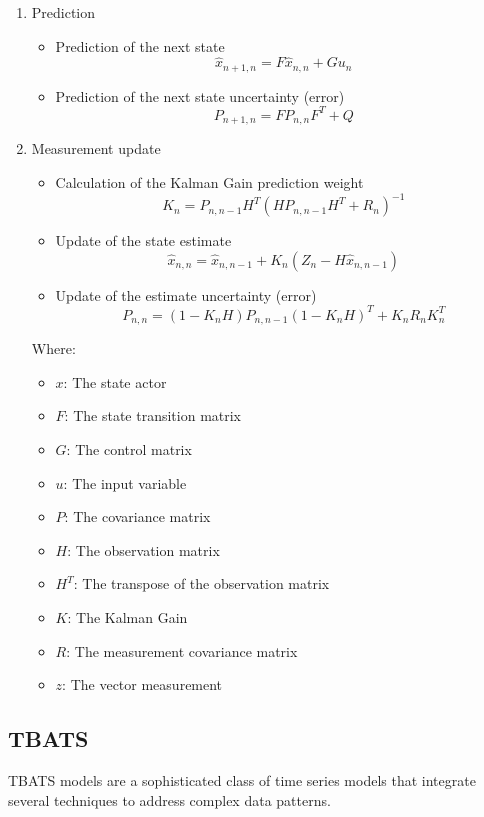 \documentclass[conference]{IEEEtran}
\begin{document}
\begin{enumerate}
    \item Prediction
    \begin{itemize}
        \item Prediction of the next state
        \[ \widehat{x}_{n + 1, n} = F\widehat{x}_{n, n} + Gu_{n} \]
        \item Prediction of the next state uncertainty (error)
        \[ P_{n + 1, n} = FP_{n, n}F^{T} + Q \]
    \end{itemize}
    \item Measurement update
    \begin{itemize}
        \item Calculation of the Kalman Gain prediction weight
        \[ K_{n} = P_{n, n - 1}H^{T}(HP_{n, n - 1}H^{T} + R_{n})^{-1} \]
        \item Update of the state estimate
        \[ \widehat{x}_{n, n} = \widehat{x}_{n, n - 1} + K_{n}(Z_{n} - H\widehat{x}_{n, n - 1}) \]
        \item Update of the estimate uncertainty (error)
        \[ P_{n, n} = (1 - K_{n}H)P_{n, n - 1}(1 - K_{n}H)^{T} + K_{n}R_{n}K_{n}^{T} \]
    \end{itemize}

Where:
    \begin{itemize}
        \item $x$: The state actor
        \item $F$: The state transition matrix
        \item $G$: The control matrix
        \item $u$: The input variable
        \item $P$: The covariance matrix
        \item $H$: The observation matrix
        \item ${H}^{T}$: The transpose of the observation matrix
        \item $K$: The Kalman Gain
        \item $R$: The measurement covariance matrix
        \item $z$: The vector measurement
    \end{itemize}
\end{enumerate}

\subsection{TBATS}  
TBATS models are a sophisticated class of time series models that integrate several techniques to address complex data patterns. 
\end{document}
